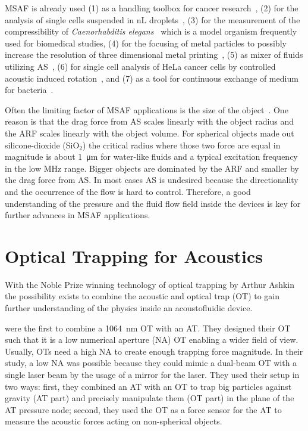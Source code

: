 MSAF is already used (1) as a handling toolbox for cancer 
research~\cite{Antfolk2015,Wu2021,Wang2020,Nguyen2021}, (2) for the analysis of 
single cells suspended in \si{\nano\liter} droplets~\cite{Gerlt2020a}, (3) for 
the measurement of the compressibility of \emph{Caenorhabditis 
elegans}~\cite{Baasch2018} which is a model organism frequently used for 
biomedical studies, (4) for the focusing of metal particles to possibly 
increase the resolution of three dimensional metal printing~\cite{Gerlt2022}, 
(5) as mixer of fluids utilizing 
AS~\cite{Patel2014,Ozcelik2014,Bachman2020,Zhang2021}, (6) for single cell 
analysis of HeLa cancer cells by controlled acoustic induced 
rotation~\cite{Laeubli2021}, and (7) as a tool for continuous exchange of 
medium for bacteria~\cite{Gerlt2021}.

Often the limiting factor of MSAF applications is the size of the 
object~\cite{Barnkob2012}. One reason is that the drag force from AS scales 
linearly with the object radius and the ARF scales linearly with the object 
volume. For spherical objects made out silicone-dioxide (SiO$_{2}$) the 
critical radius where those two force are equal in magnitude is about 
\SI{1}{\um} for water-like fluids and a typical excitation frequency in the low 
\si{\mega\hertz} range. Bigger objects are dominated by the ARF and smaller by 
the drag force from AS. In most cases AS is undesired because the 
directionality and the occurrence of the flow is hard to control. Therefore, a 
good understanding of the pressure and the fluid flow field inside the devices 
is key for further advances in MSAF applications.

\section{Optical Trapping for Acoustics}

With the Noble Prize winning technology of optical trapping by Arthur 
Ashkin~\cite{Ashkin1978,Ashkin1987,Ashkin2002,Ashkin1986,Ashkin1992,Ashkin1997} 
the possibility exists to combine the acoustic and optical trap (OT) to gain 
further understanding of the physics inside an acoustofluidic device.

 were the first to combine a \SI{1064}{\nm} OT with an 
AT. They designed their OT such that it is a low numerical aperture (NA) OT 
enabling a wider field of view. Usually, OTs need a high NA to create enough 
trapping force magnitude. In their study, a low NA was possible because they 
could mimic a dual-beam OT with a single laser beam by the usage of a mirror 
for the laser. They used their setup in two ways: first, they combined an AT 
with an OT to trap big particles against gravity (AT part) and precisely 
manipulate them (OT part) in the plane of the AT pressure node; second, they 
used the OT as a force sensor for the AT to measure the acoustic forces acting 
on non-spherical objects.

